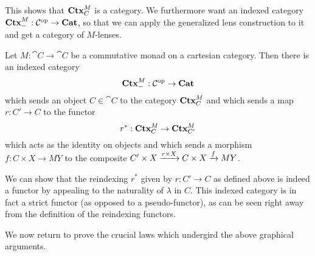 \documentclass[DynamicalBook]{subfiles}
\begin{document}
This shows that $\textbf{Ctx}_{C}^M$ is a category. We furthermore want an indexed
category $\textbf{Ctx}_{-}^M : \mathcal{C}^{\textnormal{op}} \to \textbf{Cat}$, so that we can apply the
generalized lens construction to it and get a category of $M$-lenses.

\begin{theorem}
  Let $M : \cat{C} \to \cat{C}$ be a commutative monad on a cartesian category.
  Then there is an indexed category
\[
\textbf{Ctx}_{-}^M : \mathcal{C}^{\textnormal{op}} \to \textbf{Cat}
\]
which sends an object $C \in \cat{C}$ to the category $\textbf{Ctx}_{C}^M$ and which
sends a map $r : C' \to C$ to the functor 
\[
r^{\ast} : \textbf{Ctx}_{C}^M \to \textbf{Ctx}_{C'}^M
\]
which acts as the identity on objects and which sends a morphism $f : C \times X
\to MY$ to the composite $C' \times X \xrightarrow{r \times X} C \times X \xrightarrow{f} MY$.
\end{theorem}

We can show that the reindexing $r^{\ast}$ given by $r : C' \to C$ as defined
above is indeed a functor by appealing to the naturality of $\lambda$ in $C$.
This indexed category is in fact a strict functor (as opposed to a pseudo-functor), as can be seen right away
from the definition of the reindexing functors.

We now return to prove the crucial laws which undergird the above graphical arguments.
\end{document}
